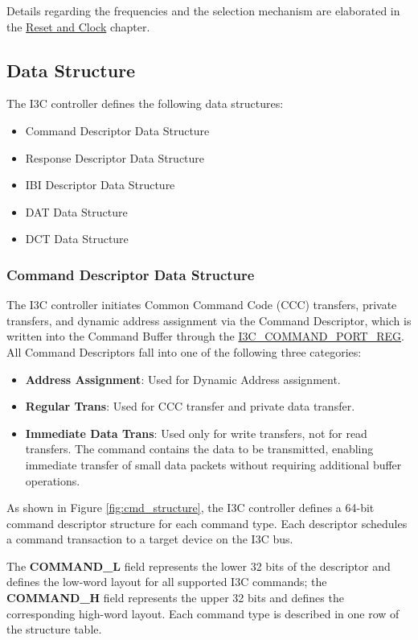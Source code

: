 \documentclass[main\_\_EN.tex]{subfiles}
\begin{document}
Details regarding the frequencies and the selection mechanism are elaborated in the \hyperref[mod:resclk]{Reset and Clock} chapter.

\subsection{Data Structure}
The I3C controller defines the following data structures:
\begin{itemize}
    \item Command Descriptor Data Structure
    \item Response Descriptor Data Structure
    \item IBI Descriptor Data Structure
    \item DAT Data Structure
    \item DCT Data Structure
\end{itemize}

\subsubsection{Command Descriptor Data Structure}

The I3C controller initiates Common Command Code (CCC) transfers, private transfers, and dynamic address assignment via the Command Descriptor, which is written into the Command Buffer through the \hyperref[regdesc:I3CMSTMEMCOMMANDBUFPORTREG]{I3C\_COMMAND\_PORT\_REG}. All Command Descriptors fall into one of the following three categories:


\begin{itemize}
    \item \textbf{Address Assignment}: Used for Dynamic Address assignment.
    \item \textbf{Regular Trans}: Used for CCC transfer and private data transfer.
    \item \textbf{Immediate Data Trans}: Used only for write transfers, not for read transfers. The command contains the data to be transmitted, enabling immediate transfer of small data packets without requiring additional buffer operations.
\end{itemize}

As shown in Figure \ref{fig:cmd_structure}, the I3C controller defines a 64-bit command descriptor structure for each command type. Each descriptor schedules a command transaction to a target device on the I3C bus.

The \textbf{COMMAND\_L} field represents the lower 32 bits of the descriptor and defines the low-word layout for all supported I3C commands; the \textbf{COMMAND\_H} field represents the upper 32 bits and defines the corresponding high-word layout. Each command type is described in one row of the structure table.
\end{document}
